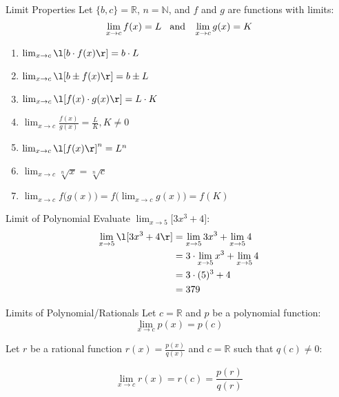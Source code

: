 \documentclass{MathNotes}
\begin{document}
\begin{theorem}{Limit Properties}
    Let $\{b, c\}=\mathbb{R}$, $n=\mathbb{N}$, and $f$ and $g$ are functions
    with limits:
    \begin{displaymath}
        \lim_{x\to c}f(x)=L\hspace{2ex}\text{and}\hspace{2ex}\lim_{x\to c}g(x)=K
    \end{displaymath}

    \begin{enumerate}
        \item $\lim_{x\to c}\l[ b\cdot f(x) \r]=b\cdot L$
        \item $\lim_{x\to c}\l[ b\pm f(x) \r]=b\pm L$
        \item $\lim_{x\to c}\l[ f(x)\cdot g(x) \r]=L\cdot K$
        \item $\lim_{x\to c}\frac{f(x)}{g(x)}=\frac{L}{K}, K\neq 0$
        \item $\lim_{x\to c}\l[ f(x)\r] ^n=L^n$
        \item $\lim_{x\to c}\sqrt[n]x=\sqrt[n]{c}$
        \item $\lim_{x\to c}f\bigl(g(x)\bigr)=f\bigl(\lim_{x\to c}g(x)\bigr)=f(K)$
    \end{enumerate}
\end{theorem}

\begin{example}{Limit of Polynomial}
    Evaluate $\lim_{x\to 5}\lbrack 3x^3 + 4 \rbrack$:
    \br
    \begin{align*}
        \lim_{x\to 5}\l[ 3x^3+4 \r] &= \lim_{x\to 5} 3x^3 + \lim_{x\to 5}4\\
        &= 3 \cdot \lim_{x\to 5}x^3 + \lim_{x\to 5}4\\
        &= 3 \cdot (5)^3 + 4 \\
        &=379
    \end{align*}
\end{example}

\begin{theorem}{Limits of Polynomial/Rationals}
    Let $c=\mathbb{R}$ and $p$ be a polynomial function:
    \begin{displaymath}
        \lim_{x\to c}p(x)=p(c)
    \end{displaymath}

    Let $r$ be a rational function $r(x)=\frac{p(x)}{q(x)}$ and $c=\mathbb{R}$
    such that $q(c)\neq 0$:

    \begin{displaymath}
        \lim_{x\to c}r(x)=r(c)=\frac{p(r)}{q(r)}
    \end{displaymath}
\end{theorem}
\end{document}
